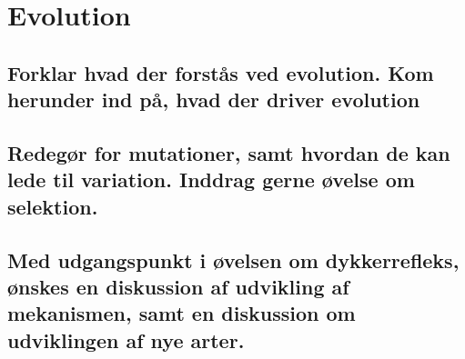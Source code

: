 \newpage
\section{Evolution}
\subsection{Forklar hvad der forstås ved evolution. Kom herunder ind på, hvad der driver evolution}
\subsection{Redegør for mutationer, samt hvordan de kan lede til variation. Inddrag gerne øvelse om selektion.}
\subsection{Med udgangspunkt i øvelsen om dykkerrefleks, ønskes en diskussion af udvikling af mekanismen, samt en diskussion om udviklingen af nye arter.}